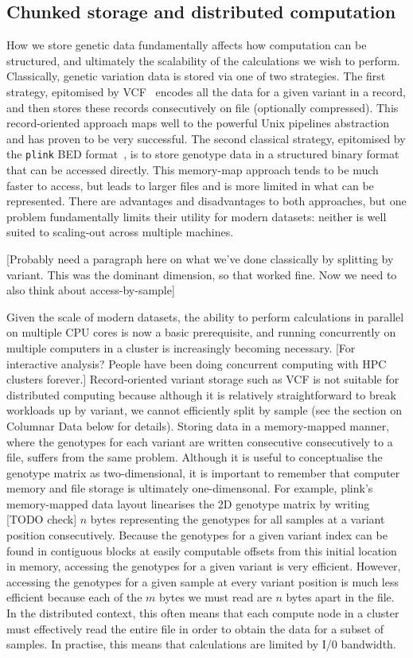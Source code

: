 \documentclass[a4paper,num-refs]{oup-contemporary}
\begin{document}
\subsection{Chunked storage and distributed computation}
How we store genetic data fundamentally affects how computation
can be structured, and ultimately the scalability of the calculations
we wish to perform. Classically, genetic variation data is stored via one
of two strategies. The first strategy, epitomised by
VCF~\citep{danecek2011variant} encodes all the data for a given
variant in a record, and then stores these records consecutively on file
(optionally compressed). This record-oriented approach maps well to the
powerful Unix pipelines abstraction and
has proven to be very successful.
The second classical strategy, epitomised
by the \texttt{plink} BED format~\citep{purcell2007plink}, is to
store genotype data in a structured binary format that can be
accessed directly. This memory-map approach tends to
be much faster to access, but leads to larger files and is more
limited in what can be represented. There are advantages and
disadvantages to both approaches, but one problem fundamentally
limits their utility for modern datasets: neither is well suited to
scaling-out across multiple machines.

[Probably need a paragraph here on what we've done classically
by splitting by variant. This was the dominant dimension, so that
worked fine. Now we need to also think about access-by-sample]

Given the scale of modern datasets, the ability to perform
calculations in parallel on multiple CPU cores
is now a basic prerequisite, and
running concurrently on multiple computers in a cluster
is increasingly becoming necessary. [For interactive analysis? People have
been doing concurrent computing with HPC clusters forever.]
Record-oriented variant storage such as VCF is not suitable
for  distributed computing because although it is relatively
straightforward to break workloads up by variant, we cannot efficiently
split by sample (see the section on Columnar Data below for details).
Storing data in a memory-mapped manner, where the genotypes
for each variant are written consecutive consecutively to a file,
suffers from the same problem. Although it is useful to conceptualise
the genotype matrix as two-dimensional, it is important to remember
that computer memory and file storage is ultimately one-dimensonal.
For example, plink's memory-mapped data layout linearises the 2D
genotype matrix by writing [TODO check] $n$ bytes representing
the genotypes for all samples at a variant position consecutively.
Because the genotypes for a given variant index can be found
in contiguous blocks at easily computable offsets from
this initial location in memory,
accessing the genotypes for a given variant is very efficient.
However, accessing the genotypes for a given sample at every
variant position is much less efficient because each of the $m$ bytes we
must read are $n$ bytes apart in the file.
In the distributed context, this often means
that each compute node  in a
cluster must effectively read the entire file in order to obtain the
data for a subset of samples. In practise, this means that calculations
are limited by I/0 bandwidth.
\end{document}

